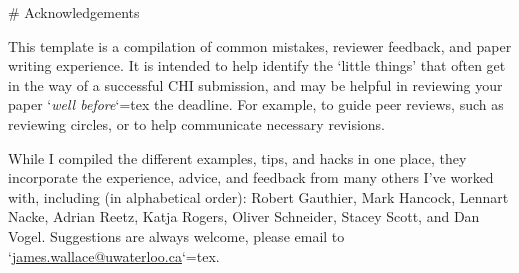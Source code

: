 

\begin{markdown}

# Acknowledgements

This template is a compilation of common mistakes, reviewer feedback, and paper writing experience. It is intended to help identify the ‘little things’ that often get in the way of a successful CHI submission, and may be helpful in reviewing your paper `\textit{well before}`{=tex} the deadline. For example, to guide peer reviews, such as reviewing circles, or to help communicate necessary revisions. 

While I compiled the different examples, tips, and hacks in one place, they incorporate the experience, advice, and feedback from many others I've worked with, including (in alphabetical order): Robert Gauthier, Mark Hancock, Lennart Nacke, Adrian Reetz, Katja Rogers, Oliver Schneider, Stacey Scott, and Dan Vogel. Suggestions are always welcome, please email to `\href{mailto:james.wallace@uwaterloo.ca}{james.wallace@uwaterloo.ca}`{=tex}. 

\end{markdown}